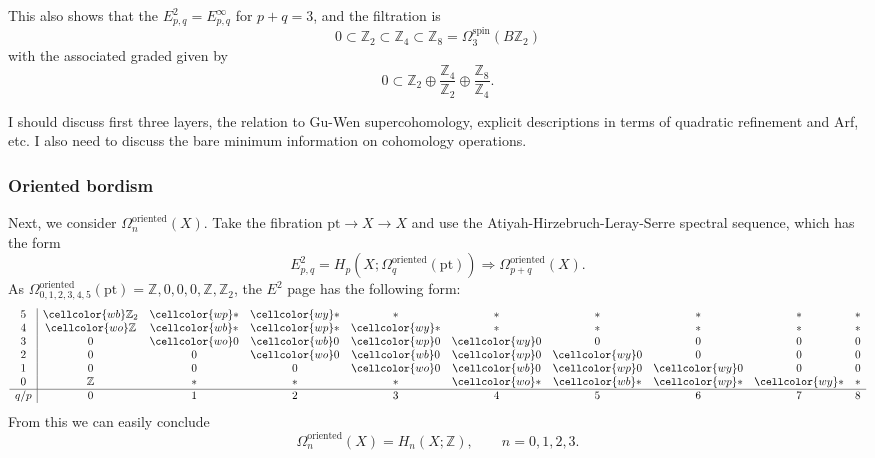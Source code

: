 \documentclass[12pt]{article}
\numberwithin{equation}{section}
\numberwithin{figure}{section}
\theoremstyle{remark}
\def\bZ{\mathbb{Z}}
\def\pt{\mathrm{pt}}
\begin{document}
This also shows that the $E^2_{p,q}=E^\infty_{p,q}$ for $p+q=3$, and the filtration 
is \begin{equation}
0 \subset \bZ_2 \subset \bZ_4 \subset \bZ_8 = \Omega^\text{spin}_3(B\bZ_2)
\end{equation} with the associated graded given by \begin{equation}
0 \subset \bZ_2 \oplus \frac{\bZ_4}{\bZ_2} \oplus \frac{\bZ_8}{\bZ_4} .
\end{equation}

{\color{red} I should discuss first three layers, the relation to Gu-Wen supercohomology,
explicit descriptions in terms of quadratic refinement and Arf, etc. 
I also need to discuss the bare minimum information on cohomology operations.}

\subsubsection{Oriented bordism}
Next, we consider $\Omega^\text{oriented}_n(X)$.
Take the fibration $\pt \to X\to X$ and use the Atiyah-Hirzebruch-Leray-Serre spectral sequence,
which has the form \begin{equation}
E^2_{p,q}=H_p(X;\Omega^\text{oriented}_q(\pt)) \Rightarrow \Omega^\text{oriented}_{p+q}(X).
\end{equation}
As $\Omega^\text{oriented}_{0,1,2,3,4,5}(\pt)=\bZ,0,0,0,\bZ,\bZ_2$,
the $E^2$ page has the following form:
\def\pikzmark#1#2{\hbox{#2}}
\begin{equation}
\begin{array}{c|cccccccccc}
5 & \cellcolor{wb}\bZ_2 &\cellcolor{wp} * & \cellcolor{wy}* & * & * & * & * & * & * \\
4 & \cellcolor{wo}\pikzmark{04}{$\bZ$} & \cellcolor{wb}\pikzmark{14}{$*$} & \cellcolor{wp}\pikzmark{24}{$*$} &  \cellcolor{wy}* & * & * & * & * & * \\
3 & 0 &\cellcolor{wo} 0 &\cellcolor{wb}0 & \cellcolor{wp}0 & \cellcolor{wy}0 & 0 &0 & 0 & 0\\
2 & 0 & 0 &\cellcolor{wo}0 & \cellcolor{wb}0 &\cellcolor{wp}0 &  \cellcolor{wy}0 &0 & 0 & 0 \\
1 & 0 & 0 &0 &\cellcolor{wo} 0 &\cellcolor{wb}0 & \cellcolor{wp}0 & \cellcolor{wy}0 & 0 & 0\\
0 & \bZ & * & * & * &\cellcolor{wo}\pikzmark{40}{$*$} & \cellcolor{wb}\pikzmark{50}{$*$} & \cellcolor{wp}\pikzmark{60}{$*$}  &  \cellcolor{wy}\pikzmark{70}{$*$} &  *\\
\hline
q/p & 0 & 1 & 2 & 3 & 4 & 5 & 6 & 7 & 8 
\end{array}
\end{equation}
From this we can easily conclude \begin{equation}
\Omega^\text{oriented}_{n}(X)=H_n(X;\bZ),\qquad n=0,1,2,3.
\end{equation} 
\end{document}
